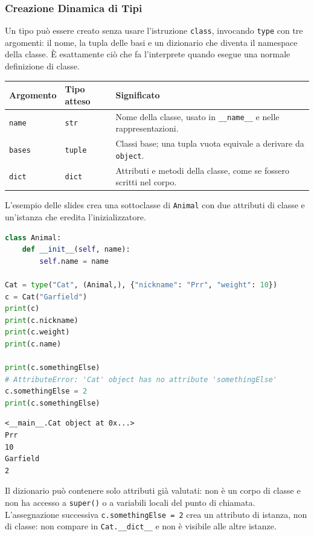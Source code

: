 \documentclass[12pt]{extarticle}
\begin{document}
\subsubsection{Creazione Dinamica di Tipi}

\noindent Un tipo può essere creato senza usare l'istruzione \texttt{class}, invocando \texttt{type} con tre argomenti: il nome, la tupla delle basi e un dizionario che diventa il namespace della classe. È esattamente ciò che fa l'interprete quando esegue una normale definizione di classe.

\begin{center}
\small
\begin{tabular}{p{3.0cm}p{4.2cm}p{7.0cm}}
    \toprule
    \textbf{Argomento} & \textbf{Tipo atteso} & \textbf{Significato} \\
    \midrule
    \texttt{name} & \texttt{str} & Nome della classe, usato in \texttt{\_\_name\_\_} e nelle rappresentazioni. \\
    \addlinespace
    \texttt{bases} & \texttt{tuple} & Classi base; una tupla vuota equivale a derivare da \texttt{object}. \\
    \addlinespace
    \texttt{dict} & \texttt{dict} & Attributi e metodi della classe, come se fossero scritti nel corpo. \\
    \bottomrule
\end{tabular}
\end{center}

\noindent L'esempio delle slides crea una sottoclasse di \texttt{Animal} con due attributi di classe e un'istanza che eredita l'inizializzatore.

\begin{lstlisting}[language=Python]
class Animal:
    def __init__(self, name):
        self.name = name

Cat = type("Cat", (Animal,), {"nickname": "Prr", "weight": 10})
c = Cat("Garfield")
print(c)
print(c.nickname)
print(c.weight)
print(c.name)

print(c.somethingElse)
# AttributeError: 'Cat' object has no attribute 'somethingElse'
c.somethingElse = 2
print(c.somethingElse)
\end{lstlisting}

\begin{lstlisting}[numbers=none]
<__main__.Cat object at 0x...>
Prr
10
Garfield
2
\end{lstlisting}

\noindent Il dizionario può contenere solo attributi già valutati: non è un corpo di classe e non ha accesso a \texttt{super()} o a variabili locali del punto di chiamata. L'assegnazione successiva \texttt{c.somethingElse = 2} crea un attributo di istanza, non di classe: non compare in \texttt{Cat.\_\_dict\_\_} e non è visibile alle altre istanze.
\end{document}

